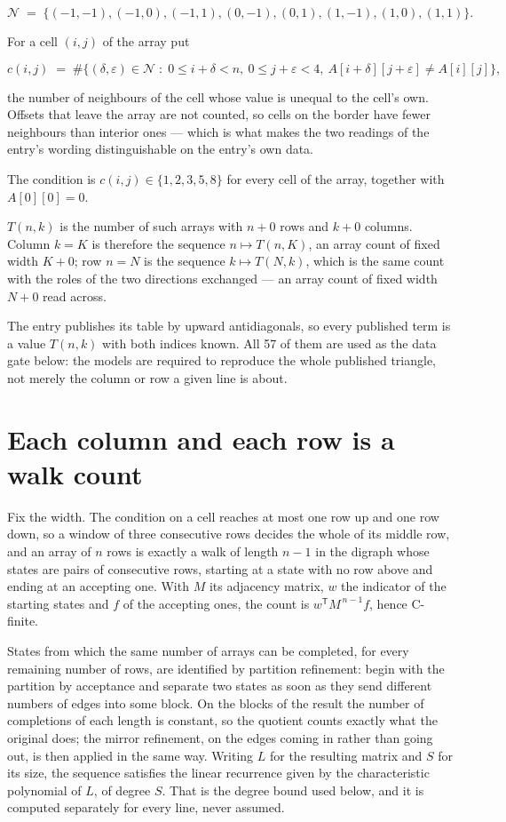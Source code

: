 \documentclass[11pt]{article}
\theoremstyle{definition}
\begin{document}
\[\mathcal{N} \;=\; \{(-1,-1), (-1,0), (-1,1), (0,-1), (0,1), (1,-1), (1,0), (1,1)\}.\]

For a cell $(i,j)$ of the array put

\[c(i,j) \;=\; \#\bigl\{(\delta,\varepsilon)\in\mathcal{N} \;:\; 0\le i+\delta<n,\ 0\le j+\varepsilon<4,\ A[i+\delta][j+\varepsilon] \neq A[i][j]\bigr\},\]

the number of neighbours of the cell whose value is unequal to the cell's own. Offsets that leave the array are not counted, so cells on the border have fewer neighbours than interior ones --- which is what makes the two readings of the entry's wording distinguishable on the entry's own data.

The condition is $c(i,j) \in \{1, 2, 3, 5, 8\}$ for every cell of the array, together with $A[0][0]=0$.

$T(n,k)$ is the number of such arrays with $n + 0$ rows and $k + 0$ columns. Column $k = K$ is therefore the sequence $n \mapsto T(n,K)$, an array count of fixed width $K + 0$; row $n = N$ is the sequence $k \mapsto T(N,k)$, which is the same count with the roles of the two directions exchanged --- an array count of fixed width $N + 0$ read across.

The entry publishes its table by upward antidiagonals, so every published term is a value $T(n,k)$ with both indices known. All 57 of them are used as the data gate below: the models are required to reproduce the whole published triangle, not merely the column or row a given line is about.

\section{Each column and each row is a walk count}

Fix the width. The condition on a cell reaches at most one row up and one row down, so a window of three consecutive rows decides the whole of its middle row, and an array of $n$ rows is exactly a walk of length $n-1$ in the digraph whose states are pairs of consecutive rows, starting at a state with no row above and ending at an accepting one. With $M$ its adjacency matrix, $w$ the indicator of the starting states and $f$ of the accepting ones, the count is $w^{\mathsf T}M^{\,n-1}f$, hence C-finite.

States from which the same number of arrays can be completed, for every remaining number of rows, are identified by partition refinement: begin with the partition by acceptance and separate two states as soon as they send different numbers of edges into some block. On the blocks of the result the number of completions of each length is constant, so the quotient counts exactly what the original does; the mirror refinement, on the edges coming in rather than going out, is then applied in the same way. Writing $L$ for the resulting matrix and $S$ for its size, the sequence satisfies the linear recurrence given by the characteristic polynomial of $L$, of degree $S$. That is the degree bound used below, and it is computed separately for every line, never assumed.
\end{document}
